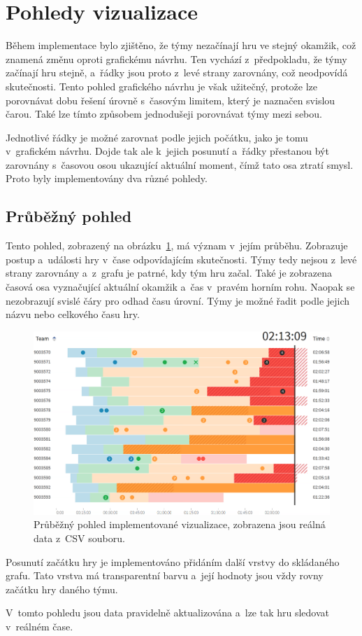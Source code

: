 \documentclass[
  digital, %
  oneside, %
  table,   %
  nolof,     %
  nolot,     %
  nocover
]{fithesis3}
\begin{document}
\section{Pohledy vizualizace}
Během implementace bylo zjištěno, že týmy nezačínají hru ve stejný okamžik, což znamená změnu oproti grafickému návrhu. Ten vychází z~předpokladu, že týmy začínají hru stejně, a~řádky jsou proto z~levé strany zarovnány, což neodpovídá skutečnosti. Tento pohled grafického návrhu je však užitečný, protože lze porovnávat dobu řešení úrovně s~časovým limitem, který je naznačen svislou čarou. Také lze tímto způsobem jednodušeji porovnávat týmy mezi sebou.\par
Jednotlivé řádky je možné zarovnat podle jejich počátku, jako je tomu v~grafickém návrhu. Dojde tak ale k~jejich posunutí a~řádky přestanou být zarovnány s~časovou osou ukazující aktuální moment, čímž tato osa ztratí smysl. Proto byly implementovány dva různé pohledy.

\subsection{Průběžný pohled}
Tento pohled, zobrazený na obrázku~\ref{fig:visualizationChartProgress}, má význam v~jejím průběhu. Zobrazuje postup a~události hry v~čase odpovídajícím skutečnosti. Týmy tedy nejsou z~levé strany zarovnány a~z~grafu je patrné, kdy tým hru začal. Také je zobrazena časová osa vyznačující aktuální okamžik a~čas v~pravém horním rohu. Naopak se nezobrazují svislé čáry pro odhad času úrovní. Týmy je možné řadit podle jejich názvu nebo celkového času hry.\par
\begin{figure}[H]
  \begin{center}
    \includegraphics[width=12.7cm]{images/vizualizace-progress.png}
  \end{center}
  \caption{Průběžný pohled implementované vizualizace, zobrazena jsou reálná data z~CSV souboru.}
  \label{fig:visualizationChartProgress}
\end{figure}
Posunutí začátku hry je implementováno přidáním další vrstvy do skládaného grafu. Tato vrstva má transparentní barvu a~její hodnoty jsou vždy rovny začátku hry daného týmu.\par
V~tomto pohledu jsou data pravidelně aktualizována a~lze tak hru sledovat v~reálném čase.
\end{document}
